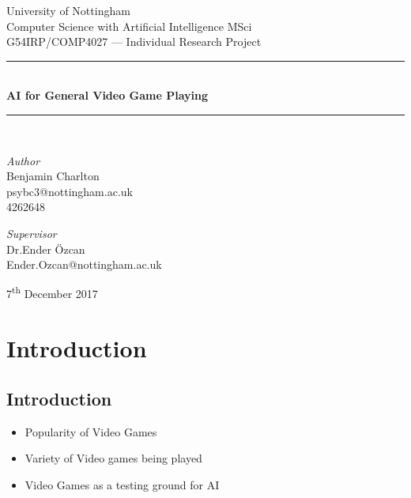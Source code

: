 \documentclass[a4paper]{article}
\begin{document}
\begin{titlepage}
	\newcommand{\HRule}{\rule{\linewidth}{0.5mm}}
	\center{}

	\LARGE{University of Nottingham}\\[1.5cm]
	\Large{Computer Science with Artificial Intelligence MSci}\\[0.5cm]
	\large{G54IRP/COMP4027 --- Individual Research Project}\\[0.5cm]

	\HRule{}\\[0.4cm]
	{\huge\bfseries AI for General Video Game Playing}\\[0.4cm]
	\HRule{}\\[1.5cm]

	\begin{minipage}{0.4\textwidth}
		\begin{flushleft}
			\large
			\textit{Author}\\
			Benjamin Charlton\\
            psybc3@nottingham.ac.uk\\
            4262648
		\end{flushleft}
	\end{minipage}
    \begin{minipage}{0.4\textwidth}
		\begin{flushright}
			\large
			\textit{Supervisor}\\
			Dr.\@ Ender \"Ozcan\\
            Ender.Ozcan@nottingham.ac.uk
		\end{flushright}
	\end{minipage}

	\vfill\vfill\vfill
	{\large7\textsuperscript{th} December 2017}
	\vfill

\end{titlepage}

\tableofcontents
\pagebreak

\section{Introduction}
\subsection{Introduction}
\begin{itemize}
    \item Popularity of Video Games
    \item Variety of Video games being played
    \item Video Games as a testing ground for AI
\end{itemize}
\end{document}
